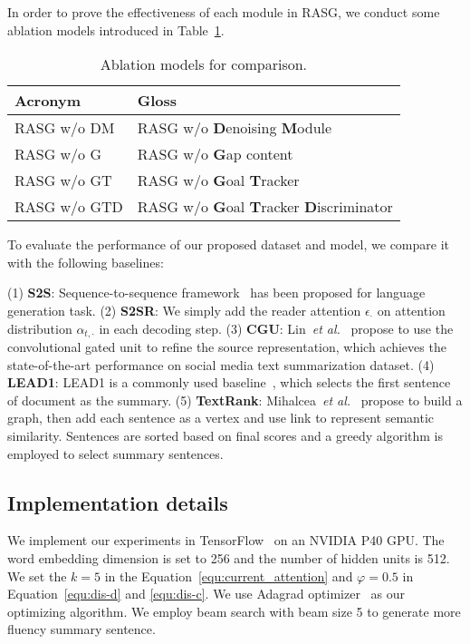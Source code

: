 \documentclass[letterpaper]{article} \usepackage{aaai19}  \usepackage{times}  \usepackage{helvet}  \usepackage{courier}
\newcommand{\etal}{\emph{et al.}\xspace}
\begin{document}
In order to prove the effectiveness of each module in RASG, we conduct some ablation models introduced in Table~\ref{tab:ablations}.

\begin{table}[t]
\centering
\caption{Ablation models for comparison.}
\label{tab:ablations}
\small
\begin{tabular}{@{}l@{~}l}
\toprule
Acronym & Gloss \\
\midrule
RASG w/o DM &  \multicolumn{1}{p{5cm}}{\small RASG w/o \textbf{D}enoising \textbf{M}odule}\\
RASG w/o G &  \multicolumn{1}{p{5cm}}{\small RASG w/o \textbf{G}ap content}\\
RASG w/o GT &  \multicolumn{1}{p{5cm}}{\small RASG w/o \textbf{G}oal \textbf{T}racker}\\
RASG w/o GTD &  \multicolumn{1}{p{5cm}}{\footnotesize RASG w/o \textbf{G}oal \textbf{T}racker \textbf{D}iscriminator}\\
\bottomrule
\end{tabular}
\end{table}

To evaluate the performance of our proposed dataset and model, we compare it with the following baselines:

\noindent (1) \textbf{S2S}: Sequence-to-sequence framework~\cite{Sutskever2014SequenceTS} has been proposed for language generation task. 
\noindent (2) \textbf{S2SR}: We simply add the reader attention $\epsilon_{\cdot}$ on attention distribution $\alpha_{t, \cdot}$ in each decoding step.
\noindent (3) \textbf{CGU}: Lin~\etal~ propose to use the convolutional gated unit to refine the source representation, which achieves the state-of-the-art performance on social media text summarization dataset.
\noindent (4) \textbf{LEAD1}: LEAD1 is a commonly used baseline~\cite{Nallapati2017SummaRuNNerAR,see2017get}, which selects the first sentence of document as the summary.
\noindent (5) \textbf{TextRank}: Mihalcea~\etal~ propose to build a graph, then add each sentence as a vertex and use link to represent semantic similarity. 
Sentences are sorted based on final scores and a greedy algorithm is employed to select summary sentences.

\subsection{Implementation details}

We implement our experiments in TensorFlow~\cite{abadi2016tensorflow} on an NVIDIA P40 GPU. 
The word embedding dimension is set to 256 and the number of hidden units is 512.
We set the $k=5$ in the Equation~\ref{equ:current_attention} and $\varphi=0.5$ in Equation~\ref{equ:dis-d} and \ref{equ:dis-c}.
We use Adagrad optimizer~\cite{Duchi2010AdaptiveSM} as our optimizing algorithm.
We employ beam search with beam size 5 to generate more fluency summary sentence.
\end{document}
